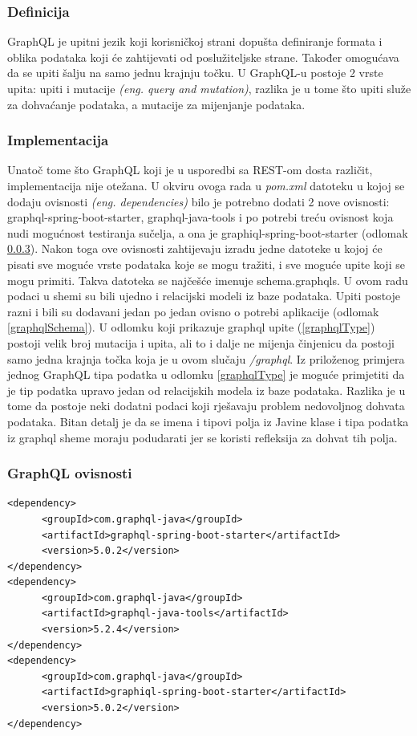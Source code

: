 \documentclass[times, utf8, zavrsni]{fer}
\begin{document}
\subsubsection{Definicija}
GraphQL je upitni jezik koji korisničkoj strani
dopušta definiranje formata i oblika podataka koji će zahtijevati od poslužiteljske strane. Također omogućava
da se upiti šalju na samo jednu krajnju točku. U GraphQL-u postoje 2 vrste upita:
upiti i mutacije \textit{(eng. query and mutation)}, razlika je u tome što upiti služe za dohvaćanje podataka,
a mutacije za mijenjanje podataka.

\subsubsection{Implementacija}
Unatoč tome što GraphQL koji je u usporedbi sa REST-om dosta različit, implementacija
nije otežana. U okviru ovoga rada u \textit{pom.xml} datoteku u kojoj se dodaju ovisnosti \textit{(eng. dependencies)}
bilo je potrebno dodati 2 nove ovisnosti: graphql-spring-boot-starter, graphql-java-tools
i po potrebi treću ovisnost koja nudi mogućnost testiranja sučelja,
a ona je graphiql-spring-boot-starter (odlomak \ref{graphqlDependecies}). Nakon toga ove ovisnosti zahtijevaju
izradu jedne datoteke u kojoj će pisati sve moguće vrste podataka koje se mogu tražiti, i sve
moguće upite koji se mogu primiti. Takva datoteka se najčešće imenuje schema.graphqls.
U ovom radu podaci u shemi su bili ujedno i relacijski modeli iz baze podataka.
Upiti postoje razni i bili su dodavani jedan po jedan ovisno o potrebi aplikacije (odlomak \ref{graphqlSchema}).
U odlomku koji prikazuje graphql upite (\ref{graphqlType})
postoji velik broj mutacija i upita, ali to i dalje ne mijenja činjenicu da postoji
samo jedna krajnja točka koja je u ovom slučaju \textit{/graphql}. Iz priloženog primjera jednog GraphQL tipa podatka u odlomku \ref{graphqlType}
je moguće primjetiti da je tip podatka upravo jedan od relacijskih modela iz baze podataka. Razlika je u tome da postoje neki dodatni podaci
koji rješavaju problem nedovoljnog dohvata podataka. Bitan detalj je da se imena i tipovi polja iz Javine klase i tipa podatka iz
graphql sheme moraju podudarati jer se koristi refleksija za dohvat tih polja.
\newpage
\subsubsection{GraphQL ovisnosti}
\label{graphqlDependecies}
\begin{Verbatim}[fontsize=\scriptsize]
<dependency>
      <groupId>com.graphql-java</groupId>
      <artifactId>graphql-spring-boot-starter</artifactId>
      <version>5.0.2</version>
</dependency>
<dependency>
      <groupId>com.graphql-java</groupId>
      <artifactId>graphql-java-tools</artifactId>
      <version>5.2.4</version>
</dependency>
<dependency>
      <groupId>com.graphql-java</groupId>
      <artifactId>graphiql-spring-boot-starter</artifactId>
      <version>5.0.2</version>
</dependency>
\end{Verbatim}
\end{document}

